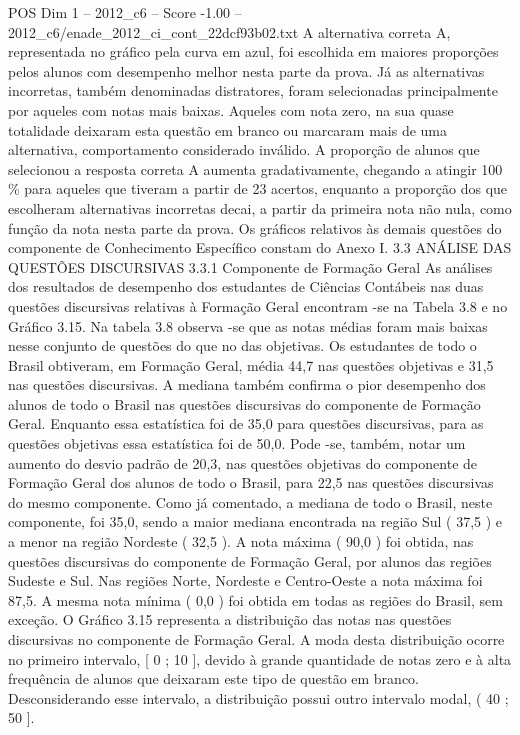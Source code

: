 \begin{textsample}{POS Dim 1 – 2012\_c6 – Score -1.00 – 2012\_c6/enade\_2012\_ci\_cont\_22dcf93b02.txt}
A alternativa correta A, representada no gráfico pela curva em azul, foi escolhida em maiores proporções pelos alunos com desempenho melhor nesta parte da prova.
Já as alternativas incorretas, também denominadas distratores, foram selecionadas principalmente por aqueles com notas mais baixas.
Aqueles com nota zero, na sua quase totalidade deixaram esta questão em branco ou marcaram mais de uma alternativa, comportamento considerado inválido.
A proporção de alunos que selecionou a resposta correta A aumenta gradativamente, chegando a atingir 100 \% para aqueles que tiveram a partir de 23 acertos, enquanto a proporção dos que escolheram alternativas incorretas decai, a partir da primeira nota não nula, como função da nota nesta parte da prova.
Os gráficos relativos às demais questões do componente de Conhecimento Específico constam do Anexo I. 3.3 ANÁLISE DAS QUESTÕES DISCURSIVAS 3.3.1 Componente de Formação Geral As análises dos resultados de desempenho dos estudantes de Ciências Contábeis nas duas questões discursivas relativas à Formação Geral encontram -se na Tabela 3.8 e no Gráfico 3.15.
Na tabela 3.8 observa -se que as notas médias foram mais baixas nesse conjunto de questões do que no das objetivas.
Os estudantes de todo o Brasil obtiveram, em Formação Geral, média 44,7 nas questões objetivas e 31,5 nas questões discursivas.
A mediana também confirma o pior desempenho dos alunos de todo o Brasil nas questões discursivas do componente de Formação Geral.
Enquanto essa estatística foi de 35,0 para questões discursivas, para as questões objetivas essa estatística foi de 50,0.
Pode -se, também, notar um aumento do desvio padrão de 20,3, nas questões objetivas do componente de Formação Geral dos alunos de todo o Brasil, para 22,5 nas questões discursivas do mesmo componente.
Como já comentado, a mediana de todo o Brasil, neste componente, foi 35,0, sendo a maior mediana encontrada na região Sul ( 37,5 ) e a menor na região Nordeste ( 32,5 ).
A nota máxima ( 90,0 ) foi obtida, nas questões discursivas do componente de Formação Geral, por alunos das regiões Sudeste e Sul.
Nas regiões Norte, Nordeste e Centro-Oeste a nota máxima foi 87,5.
A mesma nota mínima ( 0,0 ) foi obtida em todas as regiões do Brasil, sem exceção.
O Gráfico 3.15 representa a distribuição das notas nas questões discursivas no componente de Formação Geral.
A moda desta distribuição ocorre no primeiro intervalo, [ 0 ; 10 ], devido à grande quantidade de notas zero e à alta frequência de alunos que deixaram este tipo de questão em branco.
Desconsiderando esse intervalo, a distribuição possui outro intervalo modal, ( 40 ; 50 ].

\end{textsample}
